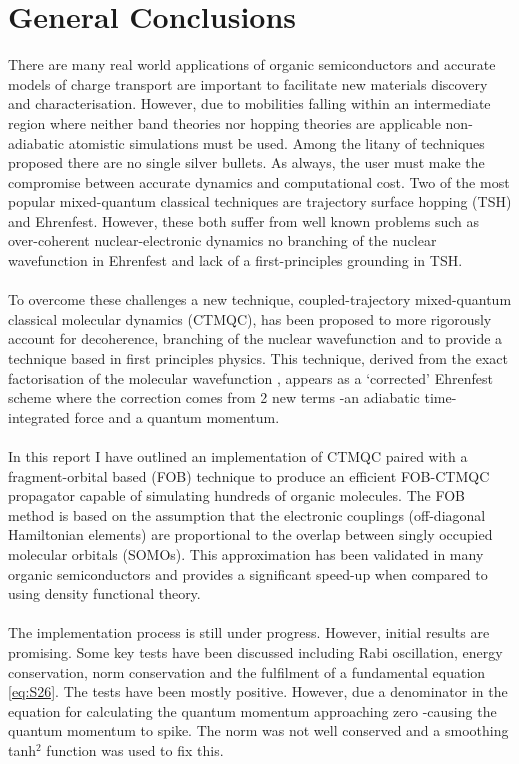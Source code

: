 \chapter{General Conclusions}
\label{Conclusions}
There are many real world applications of organic semiconductors and accurate models of charge transport are important to facilitate new materials discovery and characterisation. However, due to mobilities falling within an intermediate region where neither band theories nor hopping theories are applicable non-adiabatic atomistic simulations must be used. Among the litany of techniques proposed there are no single silver bullets. As always, the user must make the compromise between accurate dynamics and computational cost. Two of the most popular mixed-quantum classical techniques are trajectory surface hopping (TSH) and Ehrenfest. However, these both suffer from well known problems such as over-coherent nuclear-electronic dynamics  no branching of the nuclear wavefunction in Ehrenfest and lack of a first-principles grounding in TSH.
\\\\
To overcome these challenges a new technique, coupled-trajectory mixed-quantum classical molecular dynamics (CTMQC), has been proposed \cite{agostini_semiclassical_2015} to more rigorously account for decoherence, branching of the nuclear wavefunction and to provide a technique based in first principles physics. This technique, derived from the exact factorisation of the molecular wavefunction \cite{abedi_exact_2010}, appears as a `corrected' Ehrenfest scheme where the correction comes from 2 new terms -an adiabatic time-integrated force and a quantum momentum.
\\\\
In this report I have outlined an implementation of CTMQC paired with a fragment-orbital based (FOB) technique to produce an efficient FOB-CTMQC propagator capable of simulating hundreds of organic molecules. The FOB method is based on the assumption that the electronic couplings (off-diagonal Hamiltonian elements) are proportional to the overlap between singly occupied molecular orbitals (SOMOs). This approximation has been validated in many organic semiconductors and provides a significant speed-up when compared to using density functional theory.
\\\\
The implementation process is still under progress. However, initial results are promising. Some key tests have been discussed including Rabi oscillation, energy conservation, norm conservation and the fulfilment of a fundamental equation \eqref{eq:S26}. The tests have been mostly positive. However, due a denominator in the equation for calculating the quantum momentum approaching zero -causing the quantum momentum to spike. The norm was not well conserved and a smoothing tanh$^2$ function was used to fix this.
